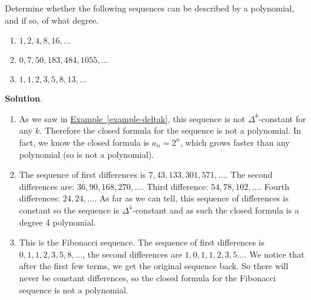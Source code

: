 \documentclass[11pt,]{book}
\theoremstyle{ptxplainnotitle}
\theoremstyle{ptxplaintitle}
\theoremstyle{ptxdefinitionnotitle}
\theoremstyle{ptxdefinitiontitle}
\theoremstyle{ptxdefinitionnotitle}
\theoremstyle{ptxdefinitiontitle}
\theoremstyle{ptxdefinitionnotitle}
\theoremstyle{ptxdefinitiontitle}
\theoremstyle{ptxdefinitiontitlenonumber}
\theoremstyle{ptxdefinitiontitlenonumber}
\numberwithin{equation}{chapter}
\begin{document}
\begin{example}\label{example-17}
\hypertarget{p-382}{}%
Determine whether the following sequences can be described by a polynomial, and if so, of what degree. \leavevmode%
\begin{enumerate}
\item\hypertarget{li-211}{}\(1, 2, 4, 8, 16, \ldots\)%
\item\hypertarget{li-212}{}\(0, 7, 50, 183, 484, 1055, \ldots\)%
\item\hypertarget{li-213}{}\(1,1,2,3,5,8,13,\ldots\)%
\end{enumerate}
%
\par\smallskip%
\noindent\textbf{Solution}.\hypertarget{solution-46}{}\quad%
\hypertarget{p-383}{}%
\leavevmode%
\begin{enumerate}
\item\hypertarget{li-214}{}\hypertarget{p-384}{}%
As we saw in \hyperref[example-deltak]{Example~\ref{example-deltak}}, this sequence is not \(\Delta^k\)-constant for any \(k\). Therefore the closed formula for the sequence is not a polynomial. In fact, we know the closed formula is \(a_n = 2^n\), which grows faster than any polynomial (so is not a polynomial).%
\item\hypertarget{li-215}{}\hypertarget{p-385}{}%
The sequence of first differences is \(7, 43, 133, 301, 571,\ldots\). The second differences are: \(36, 90, 168, 270,\ldots\). Third difference: \(54, 78, 102,\ldots\). Fourth differences: \(24, 24, \ldots\). As far as we can tell, this sequence of differences is constant so the sequence is \(\Delta^4\)-constant and as such the closed formula is a degree 4 polynomial.%
\item\hypertarget{li-216}{}\hypertarget{p-386}{}%
This is the Fibonacci sequence. The sequence of first differences is \(0, 1, 1, 2, 3, 5, 8, \ldots\), the second differences are \(1, 0, 1, 1, 2, 3, 5\ldots\). We notice that after the first few terms, we get the original sequence back. So there will never be constant differences, so the closed formula for the Fibonacci sequence is not a polynomial.%
\end{enumerate}
%
\end{example}
\typeout{************************************************}
\typeout{************************************************}
\end{document}
